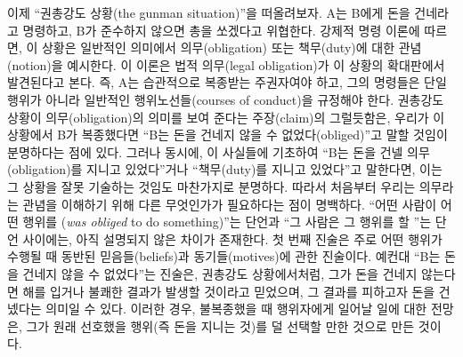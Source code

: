 이제 “권총강도 상황(the gunman situation)”을 떠올려보자. A는 B에게
돈을 건네라고 명령하고, B가 준수하지 않으면 총을 쏘겠다고 위협한다.
강제적 명령 이론에 따르면, 이 상황은 일반적인 의미에서 의무(obligation)
또는 책무(duty)에 대한 관념(notion)을 예시한다. 이 이론은 법적
의무(legal obligation)가 이 상황의 확대판에서 발견된다고 본다. 즉, A는
습관적으로 복종받는 주권자여야 하고, 그의 명령들은 단일 행위가 아니라
일반적인 행위노선들(courses of conduct)을 규정해야 한다. 권총강도 상황이
의무(obligation)의 의미를 보여 준다는 주장(claim)의 그럴듯함은, 우리가
이 상황에서 B가 복종했다면 “B는 돈을 건네지 않을 수 없었다(obliged)”고
말할 것임이 분명하다는 점에 있다. 그러나 동시에, 이 사실들에 기초하여
“B는 돈을 건넬 의무(obligation)를 지니고 있었다”거나 “책무(duty)를
지니고 있었다”고 말한다면, 이는 그 상황을 잘못 기술하는 것임도
마찬가지로 분명하다. 따라서 처음부터 우리는 의무라는 관념을 이해하기
위해 다른 무엇인가가 필요하다는 점이 명백하다. “어떤 사람이 어떤 행위를
(\emph{was obliged} to do something)”는
단언과 “그 사람은 그 행위를 할 ”는 단언 사이에는, 아직 설명되지 않은 차이가 존재한다. 첫
번째 진술은 주로 어떤 행위가 수행될 때 동반된 믿음들(beliefs)과
동기들(motives)에 관한 진술이다. 예컨대 “B는 돈을 건네지 않을 수
없었다”는 진술은, 권총강도 상황에서처럼, 그가 돈을 건네지 않는다면 해를
입거나 불쾌한 결과가 발생할 것이라고 믿었으며, 그 결과를 피하고자 돈을
건넸다는 의미일 수 있다. 이러한 경우, 불복종했을 때 행위자에게 일어날
일에 대한 전망은, 그가 원래 선호했을 행위(즉 돈을 지니는 것)를 덜 선택할
만한 것으로 만든 것이다.

